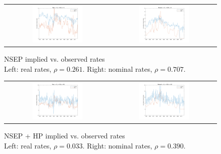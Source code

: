 \begin{figure}[h]
\ContinuedFloat
\centering
\captionsetup{singlelinecheck=false, justification=centering}
\caption{NSEP  implied vs. observed rates \\ Left: real rates, $\rho = 0.261$. Right: nominal rates, $\rho = 0.707$.}
\begin{tabular}{cc}
\includegraphics[width=0.5\textwidth]{figs/nipa/real_nsep} &
\includegraphics[width=0.5\textwidth]{figs/nipa/nominal_nsep}
\end{tabular}
\end{figure}

\begin{figure}[h]
\ContinuedFloat
\centering
\captionsetup{singlelinecheck=false, justification=centering}
\caption{NSEP + HP implied vs. observed rates \\ Left: real rates, $\rho = 0.033$. Right: nominal rates, $\rho = 0.390$.}
\begin{tabular}{cc}
\includegraphics[width=0.5\textwidth]{figs/nipa/real_nsep-hp} &
\includegraphics[width=0.5\textwidth]{figs/nipa/nominal_nsep-hp}
\end{tabular}
\end{figure}